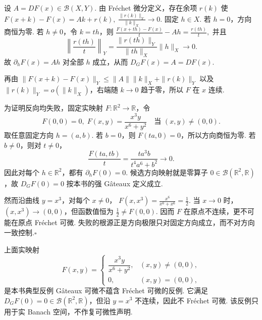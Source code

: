 \begin{FAProof}
设 \(\displaystyle A=DF(x)\in\mathcal B(X,Y)\). 由 Fréchet 微分定义，存在余项 \(\displaystyle r(k)\) 使
\(\displaystyle F(x+k)-F(x)=Ak+r(k), \; \frac{\|r(k)\|_Y}{\|k\|_X}\longrightarrow0.\)
固定 \(\displaystyle h\in X\). 若 \(\displaystyle h=0\)，方向商恒为零. 若 \(\displaystyle h\neq0\)，令 \(\displaystyle k=th\)，则
\(\displaystyle \frac{F(x+th)-F(x)}{t}-Ah = \frac{r(th)}{t},\)
并且
\[
\left\|\frac{r(th)}{t}\right\|_Y
=
\frac{\|r(th)\|_Y}{\|th\|_X}\|h\|_X
\longrightarrow0.
\]
故 \(\displaystyle\partial_hF(x)=Ah\) 对全部 \(\displaystyle h\) 成立，从而 \(\displaystyle D_GF(x)=A=DF(x)\).

再由
\(\displaystyle \|F(x+k)-F(x)\|_Y \leqslant \|A\|\|k\|_X+\|r(k)\|_Y\)
以及 \(\displaystyle\|r(k)\|_Y=o(\|k\|_X)\)，右端随 \(\displaystyle k\to0\) 趋于零，所以 \(\displaystyle F\) 在 \(\displaystyle x\) 连续.

为证明反向均失败，固定实映射 \(\displaystyle F:\mathbb R^2\to\mathbb R\)，令
\[
F(0,0)=0,
\;
F(x,y)=\frac{x^3y}{x^6+y^2}
\quad
\text{当 }(x,y)\neq(0,0).
\]
取任意固定方向 \(\displaystyle h=(a,b)\). 若 \(\displaystyle b=0\)，则 \(\displaystyle F(ta,0)=0\)，所以方向商恒为零. 若 \(\displaystyle b\neq0\)，则对 \(\displaystyle t\neq0\)，
\[
\frac{F(ta,tb)}{t}
=
\frac{t a^3b}{t^4a^6+b^2}
\longrightarrow0.
\]
因此对每个 \(\displaystyle h\in\mathbb R^2\)，都有 \(\displaystyle\partial_hF(0)=0\). 候选方向映射就是零算子 \(\displaystyle0\in\mathcal B(\mathbb R^2,\mathbb R)\)，故 \(\displaystyle D_GF(0)=0\) 按本书的强 Gâteaux 定义成立.

然而沿曲线 \(\displaystyle y=x^3\)，对每个 \(\displaystyle x\neq0\)，
\(\displaystyle F(x,x^3) = \frac{x^6}{x^6+x^6} = \frac{1}{2}.\)
当 \(\displaystyle x\to0\) 时，\(\displaystyle(x,x^3)\to(0,0)\)，但函数值恒为 \(\displaystyle\frac{1}{2}\neq F(0,0)\). 因而 \(\displaystyle F\) 在原点不连续，更不可能在原点 Fréchet 可微. 失败的根源正是方向极限只对固定方向成立，而不对方向一致控制.\hfill\(\square\)
\end{FAProof}

\begin{FACounterexample}\label{ce:CE-GATEAUX-NOT-FRECHET}
上面实映射
\[
F(x,y)=
\begin{cases}
\dfrac{x^3y}{x^6+y^2},&(x,y)\neq(0,0),\\
0,&(x,y)=(0,0),
\end{cases}
\]
是本书典型反例 Gâteaux 可微不蕴含 Fréchet 可微的反例. 它满足 \(\displaystyle D_GF(0)=0\in\mathcal B(\mathbb R^2,\mathbb R)\)，但沿 \(\displaystyle y=x^3\) 不连续，因此不 Fréchet 可微. 该反例只用于实 Banach 空间，不作复可微性声明.
\end{FACounterexample}


